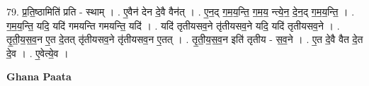 \documentclass[17pt]{extarticle}
\begin{document}
79. प्र॒ति॒ष्ठामिति॑ प्रति - स्थाम् । . ए॒वैन॑ देन दे॒वै वैन॑त् । . ए॒न॒द् ग॒म॒य॒न्ति॒ ग॒म॒य॒ न्त्ये॒न॒ दे॒न॒द् ग॒म॒य॒न्ति॒ । . ग॒म॒य॒न्ति॒ यदि॒ यदि॑ गमयन्ति गमयन्ति॒ यदि॑ । . यदि॑ तृतीयसव॒ने तृ॑तीयसव॒ने यदि॒ यदि॑ तृतीयसव॒ने । . तृ॒ती॒य॒स॒व॒न ए॒त दे॒तत् तृ॑तीयसव॒ने तृ॑तीयसव॒न ए॒तत् । . तृ॒ती॒य॒स॒व॒न इति॑ तृतीय - स॒व॒ने । . ए॒त दे॒वै वैत दे॒त दे॒व । . ए॒वेत्ये॒व । \newline

\textbf{Ghana Paata } \newline
\end{document}
